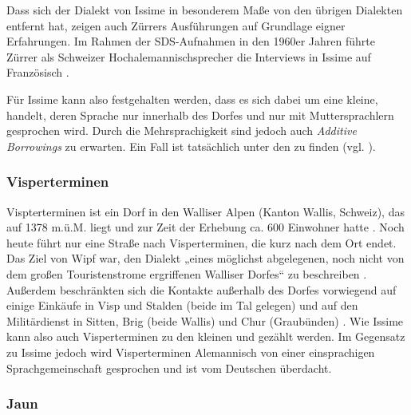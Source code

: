 Dass sich der Dialekt von Issime in besonderem Maße von den übrigen Dialekten entfernt hat, zeigen auch Zürrers Ausführungen auf Grundlage eigner Erfahrungen. Im Rahmen der SDS-Aufnahmen in den 1960er Jahren führte Zürrer als Schweizer Hochalemannischsprecher die Interviews in Issime auf Französisch \citep[38]{Zürrer1999}.

Für Issime kann also festgehalten werden, dass es sich dabei um eine kleine,  handelt, deren Sprache nur innerhalb des Dorfes und nur mit Muttersprachlern gesprochen wird. Durch die Mehrsprachigkeit sind jedoch auch \textit{Additive Borrowings} zu erwarten. Ein Fall ist tatsächlich unter den  zu finden (vgl. ).

\subsubsection{Visperterminen}

Vispterterminen ist ein Dorf in den Walliser Alpen (Kanton Wallis, Schweiz), das auf 1378 m.ü.M. liegt und zur Zeit der Erhebung ca. 600 Einwohner hatte \citep[1]{Wipf1911}. Noch heute führt nur eine Straße nach Visperterminen, die kurz nach dem Ort endet. Das Ziel von Wipf war, den Dialekt „eines möglichst abgelegenen, noch nicht von dem großen Touristenstrome ergriffenen Walliser Dorfes“ zu beschreiben \citep[1]{Wipf1911}. Außerdem beschränkten sich die Kontakte außerhalb des Dorfes vorwiegend auf einige Einkäufe in Visp und Stalden (beide im Tal gelegen) und auf den Militärdienst in Sitten, Brig (beide Wallis) und Chur (Graubünden) \citep[1--2]{Wipf1911}. Wie Issime kann also auch Visperterminen zu den kleinen und  gezählt werden. Im Gegensatz zu Issime jedoch wird Visperterminen Alemannisch von einer einsprachigen Sprachgemeinschaft gesprochen und ist vom Deutschen überdacht.

\subsubsection{Jaun}

